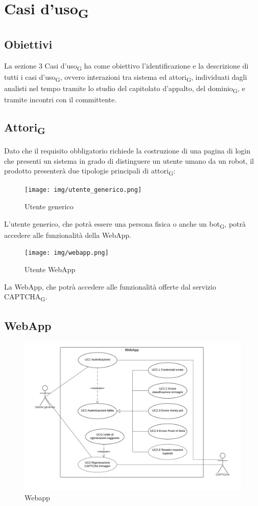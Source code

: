 \section{Casi d'uso\textsubscript{G}}

\subsection{Obiettivi}
La sezione 3 Casi d'uso\textsubscript{G} ha come obiettivo l'identificazione e la descrizione di tutti i casi d'uso\textsubscript{G}, ovvero interazioni tra sistema ed attori\textsubscript{G}, individuati dagli analisti nel tempo tramite lo studio del capitolato d'appalto, del dominio\textsubscript{G}, e tramite incontri con il committente.

\subsection{Attori\textsubscript{G}}
Dato che il requisito obbligatorio richiede la costruzione di una pagina di login che presenti un sistema in grado di distinguere un utente umano da un robot, il prodotto presenterà due tipologie principali di attori\textsubscript{G}:
\begin{figure}[H]
    \centering
    \texttt{[image: img/utente\_generico.png]}\\
    \caption{Utente generico}
\end{figure}
L'utente generico, che potrà essere una persona fisica o anche un bot\textsubscript{G}, potrà accedere alle funzionalità della WebApp. \\
\begin{figure}[H]
    \centering
    \texttt{[image: img/webapp.png]}\\
    \caption{Utente WebApp}
\end{figure}
La WebApp, che potrà accedere alle funzionalità offerte dal servizio CAPTCHA\textsubscript{G}. \\

\subsection{WebApp}

\begin{figure}[H]
    \centering
    \includegraphics[scale=0.6]{img/web_app.png}
    \caption{Webapp}
\end{figure}

